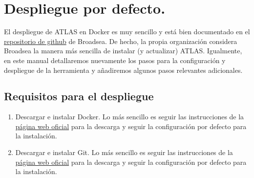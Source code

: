 \chapter{Despliegue por defecto.}

El despliegue de ATLAS en Docker es muy sencillo y está bien documentado en el  \href{https://github.com/OHDSI/Broadsea}{repositorio de github} de Broadsea. De hecho, la propia organización considera Broadsea la manera más sencilla de instalar (y actualizar) ATLAS. Igualmente, en este manual detallaremos nuevamente los pasos para la configuración y despliegue de la herramienta y añadiremos algunos pasos relevantes adicionales.

\section{Requisitos para el despliegue}

\begin{enumerate}
    \item Descargar e instalar Docker. Lo más sencillo es seguir las instrucciones de la \href{https://docs.docker.com/engine/install/}{página web oficial} para la descarga y seguir la configuración por defecto para la instalación.
    
    \item Descargar e instalar Git. Lo más sencillo es seguir las instrucciones de la \href{https://git-scm.com/downloads}{página web oficial} para la descarga y seguir la configuración por defecto para la instalación.
\end{enumerate}


